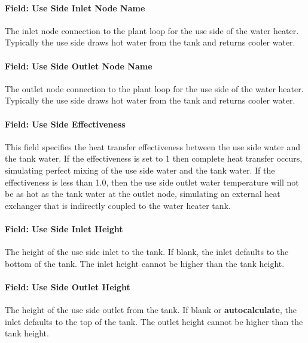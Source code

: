 \paragraph{Field: Use Side Inlet Node Name}\label{field-use-side-inlet-node-name-1-000}

The inlet node connection to the plant loop for the use side of the water heater. Typically the use side draws hot water from the tank and returns cooler water.

\paragraph{Field: Use Side Outlet Node Name}\label{field-use-side-outlet-node-name-1-000}

The outlet node connection to the plant loop for the use side of the water heater. Typically the use side draws hot water from the tank and returns cooler water.

\paragraph{Field: Use Side Effectiveness}\label{field-use-side-effectiveness-1}

This field specifies the heat transfer effectiveness between the use side water and the tank water. If the effectiveness is set to 1 then complete heat transfer occurs, simulating perfect mixing of the use side water and the tank water. If the effectiveness is less than 1.0, then the use side outlet water temperature will not be as hot as the tank water at the outlet node, simulating an external heat exchanger that is indirectly coupled to the water heater tank.

\paragraph{Field: Use Side Inlet Height}\label{field-use-side-inlet-height-000}

The height of the use side inlet to the tank. If blank, the inlet defaults to the bottom of the tank. The inlet height cannot be higher than the tank height.

\paragraph{Field: Use Side Outlet Height}\label{field-use-side-outlet-height-000}

The height of the use side outlet from the tank. If blank or \textbf{autocalculate}, the inlet defaults to the top of the tank. The outlet height cannot be higher than the tank height.

